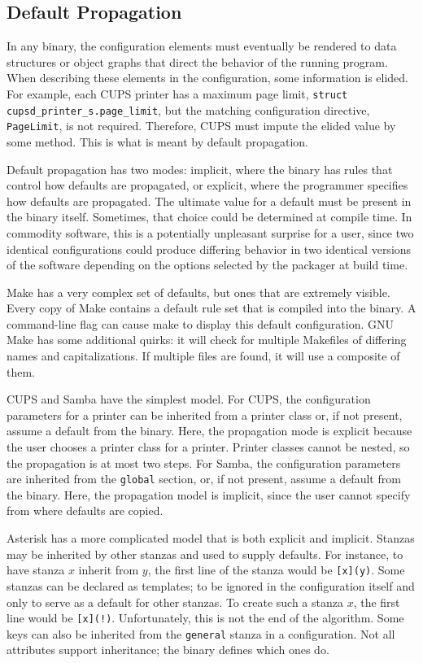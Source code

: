 \documentclass[letterpaper,twocolumn,10pt]{article}
\begin{document}
\subsection{Default Propagation}
In any binary, the configuration elements must eventually be rendered to data structures or object graphs that direct the behavior of the running program. When describing these elements in the configuration, some information is elided. For example, each CUPS printer has a maximum page limit, \verb!struct cupsd_printer_s.page_limit!, but the matching configuration directive, \verb!PageLimit!, is not required. Therefore, CUPS must impute the elided value by some method. This is what is meant by default propagation.

Default propagation has two modes: implicit, where the binary has rules that control how defaults are propagated, or explicit, where the programmer specifies how defaults are propagated. The ultimate value for a default must be present in the binary itself. Sometimes, that choice could be determined at compile time. In commodity software, this is a potentially unpleasant surprise for a user, since two identical configurations could produce differing behavior in two identical versions of the software depending on the options selected by the packager at build time.

Make has a very complex set of defaults, but ones that are extremely visible. Every copy of Make contains a default rule set that is compiled into the binary. A command-line flag can cause make to display this default configuration. GNU Make has some additional quirks: it will check for multiple Makefiles of differing names and capitalizations. If multiple files are found, it will use a composite of them.\cite{make}

CUPS and Samba have the simplest model. For CUPS, the configuration parameters for a printer can be inherited from a printer class or, if not present, assume a default from the binary.\cite{cups} Here, the propagation mode is explicit because the user chooses a printer class for a printer. Printer classes cannot be nested, so the propagation is at most two steps. For Samba, the configuration parameters are inherited from the \texttt{global} section, or, if not present, assume a default from the binary.\cite{samba} Here, the propagation model is implicit, since the user cannot specify from where defaults are copied.

Asterisk has a more complicated model that is both explicit and implicit. Stanzas may be inherited by other stanzas and used to supply defaults. For instance, to have stanza $x$ inherit from $y$, the first line of the stanza would be \verb![x](y)!. Some stanzas can be declared as templates; to be ignored in the configuration itself and only to serve as a default for other stanzas. To create such a stanza $x$, the first line would be \verb#[x](!)#. Unfortunately, this is not the end of the algorithm. Some keys can also be inherited from the \texttt{general} stanza in a configuration. Not all attributes support inheritance; the binary defines which ones do.
\end{document}
